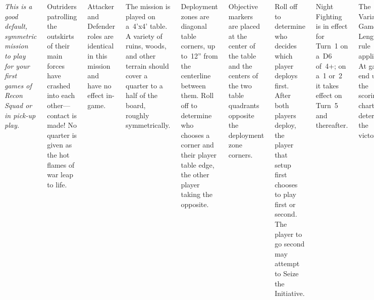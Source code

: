 
\begin{columns}

  \emph{This is a good default, symmetric mission to play for your
    first games of Recon Squad or in pick-up play.}

  
\bigskip{}%

\smallskip\noindent Outriders patrolling the outskirts of their main
forces have crashed into each other---contact is made!  No quarter is
given as the hot flames of war leap to life.


 Attacker and Defender roles are
identical in this mission and have no effect in-game.

\bigskip{}%

\smallskip\noindent The mission is played on a~4'x4' table.  A variety
of ruins, woods, and other terrain should cover a quarter to a half of
the board, roughly symmetrically.

Deployment zones are diagonal table corners, up to~12'' from the
centerline between them.  Roll off to determine who chooses a corner
and their player table edge, the other player taking the opposite.

Objective markers are placed at the center of the table and the
centers of the two table quadrants opposite the deployment zone
corners.

\bigskip{}%

Roll off to determine who decides which player deploys first.  After
both players deploy, the player that setup first chooses to play first
or second.  The player to go second may attempt to Seize the
Initiative.

Night Fighting is in effect for Turn~1 on a~D6 of~4+; on a~1 or~2 it
takes effect on Turn~5 and thereafter.

The Variable Game Length rule applies.  At game end use the scoring
chart to determine the victor!


\end{columns}
